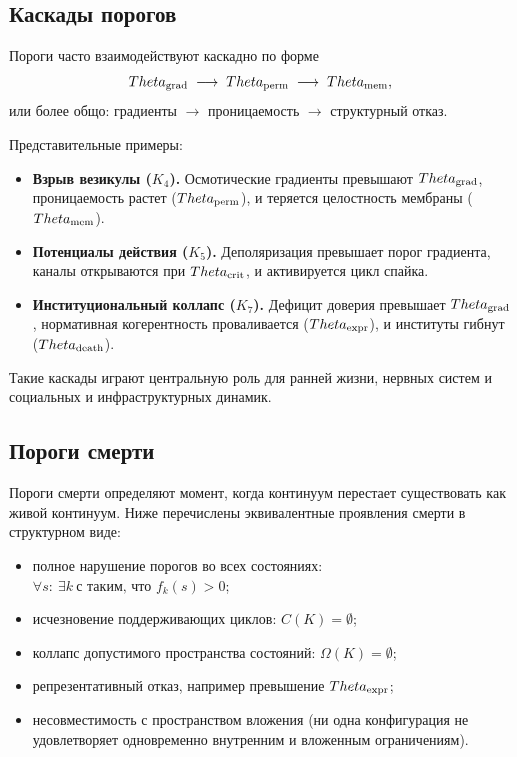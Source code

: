 \subsection{Каскады порогов}

Пороги часто взаимодействуют каскадно по форме
\[
  \Theta_{\rm grad}
  \;\longrightarrow\;
  \Theta_{\rm perm}
  \;\longrightarrow\;
  \Theta_{\rm mem},
\]
или более общо: градиенты \(\to\) проницаемость \(\to\) структурный отказ.

Представительные примеры:

\begin{itemize}
    \item \textbf{Взрыв везикулы (\(K_4\)).}  
          Осмотические градиенты превышают \(\Theta_{\rm grad}\), проницаемость растет
          (\(\Theta_{\rm perm}\)), и теряется целостность мембраны
          (\(\Theta_{\rm mem}\)).
    \item \textbf{Потенциалы действия (\(K_5\)).}  
          Деполяризация превышает порог градиента, каналы открываются при
          \(\Theta_{\rm crit}\), и активируется цикл спайка.
    \item \textbf{Институциональный коллапс (\(K_7\)).}  
          Дефицит доверия превышает \(\Theta_{\rm grad}\), нормативная когерентность
          проваливается (\(\Theta_{\rm expr}\)), и институты гибнут
          (\(\Theta_{\rm death}\)).
\end{itemize}

Такие каскады играют центральную роль для ранней жизни, нервных систем и
социальных и инфраструктурных динамик.

\subsection{Пороги смерти}

Пороги смерти определяют момент, когда континуум перестает существовать как живой
континуум. Ниже перечислены эквивалентные проявления смерти в структурном виде:
\begin{itemize}
    \item полное нарушение порогов во всех состояниях:
          \(\forall s:\ \exists k\ \text{с таким, что } f_k(s) > 0\);
    \item исчезновение поддерживающих циклов: \(C(K)=\emptyset\);
    \item коллапс допустимого пространства состояний: \(\Omega(K)=\emptyset\);
    \item репрезентативный отказ, например превышение \(\Theta_{\rm expr}\);
    \item несовместимость с пространством вложения (ни одна конфигурация
          не удовлетворяет одновременно внутренним и вложенным ограничениям).
\end{itemize}

